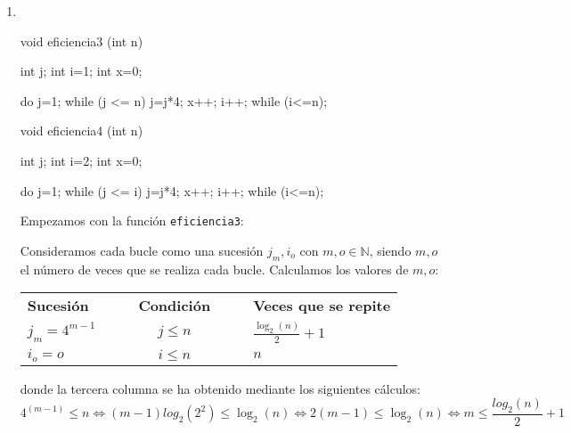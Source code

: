 \begin{ejercicio}
\begin{enumerate}[label=\alph*)]
        \item \
        \begin{table}[H]
            \begin{minipage}{0.4\linewidth}
            \centering
            \begin{cppcode}
void eficiencia3 (int n){
    int j; int i=1; int x=0;
    
    do{
        j=1;
        while (j <= n){
            j=j*4;
            x++;
        }
        i++;
    }while (i<=n);
}
            \end{cppcode}
            \end{minipage}%
            \begin{minipage}{0.2\linewidth}
            \vline
            \end{minipage}%
            \begin{minipage}{0.4\linewidth}
            \centering
            \begin{cppcode}
void eficiencia4 (int n){
    int j; int i=2; int x=0;
    
    do{
        j=1;
        while (j <= i){
            j=j*4;
            x++;
        }
        i++;
    }while (i<=n);
}
            \end{cppcode}
            \end{minipage}
            \end{table}

            Empezamos con la función \verb|eficiencia3|:

            Consideramos cada bucle como una sucesión $j_m, i_o$ con $m,o\in \mathbb{N}$, siendo $m,o$ el número de veces que se realiza cada bucle. Calculamos los valores de $m,o$:
            \begin{center}
                \begin{tabular}{l l l c l l l}
                    \textbf{Sucesión}    &&&  \textbf{Condición} &&& \textbf{Veces que se repite}\\
                    $j_m = 4^{m-1}$            &&& $j\leq n$           &&& $\frac{\log_2(n)}{2}+1$\\
                    $i_o = o$    &&& $i\leq n$           &&& $n$\\
                \end{tabular}
            \end{center}
            donde la tercera columna se ha obtenido mediante los siguientes cálculos:
            \begin{equation*}
                4^{(m-1)} \leq n \Leftrightarrow (m-1) log_2 (2^2) \leq \log_2(n) \Leftrightarrow 2(m-1) \leq \log_2(n) \Leftrightarrow m\leq \frac{log_2(n)}{2} +1
            \end{equation*}
            

\end{enumerate}
\end{ejercicio}
